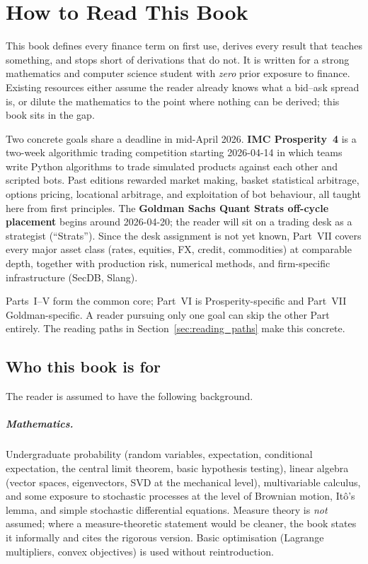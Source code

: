 \chapter{How to Read This Book}
\label{ch:how_to_read}

This book defines every finance term on first use, derives every result
that teaches something, and stops short of derivations that do not. It is
written for a strong mathematics and computer science student with
\emph{zero} prior exposure to finance. Existing resources either assume
the reader already knows what a bid--ask spread is, or dilute the
mathematics to the point where nothing can be derived; this book sits in
the gap.

Two concrete goals share a deadline in mid-April 2026. \textbf{IMC
Prosperity~4} is a two-week algorithmic trading competition starting
2026-04-14 in which teams write Python algorithms to trade simulated
products against each other and scripted bots. Past editions rewarded
market making, basket statistical arbitrage, options pricing, locational
arbitrage, and exploitation of bot behaviour, all taught here from
first principles. The \textbf{Goldman Sachs Quant Strats off-cycle
placement} begins around 2026-04-20; the reader will sit on a trading
desk as a strategist (``Strats''). Since the desk assignment is not yet
known, Part~VII covers every major asset class (rates, equities, FX,
credit, commodities) at comparable depth, together with production
risk, numerical methods, and firm-specific infrastructure (SecDB, Slang).

Parts~I--V form the common core; Part~VI is Prosperity-specific and
Part~VII Goldman-specific. A reader pursuing only one goal can skip the
other Part entirely. The reading paths in
Section~\ref{sec:reading_paths} make this concrete.

\section{Who this book is for}
\label{sec:who_for}

The reader is assumed to have the following background.

\paragraph{Mathematics.} Undergraduate probability (random variables,
expectation, conditional expectation, the central limit theorem, basic
hypothesis testing), linear algebra (vector spaces, eigenvectors, SVD at
the mechanical level), multivariable calculus, and some exposure to
stochastic processes at the level of Brownian motion, It\^o's lemma, and
simple stochastic differential equations. Measure theory is \emph{not}
assumed; where a measure-theoretic statement would be cleaner, the book
states it informally and cites the rigorous version. Basic optimisation
(Lagrange multipliers, convex objectives) is used without reintroduction.

